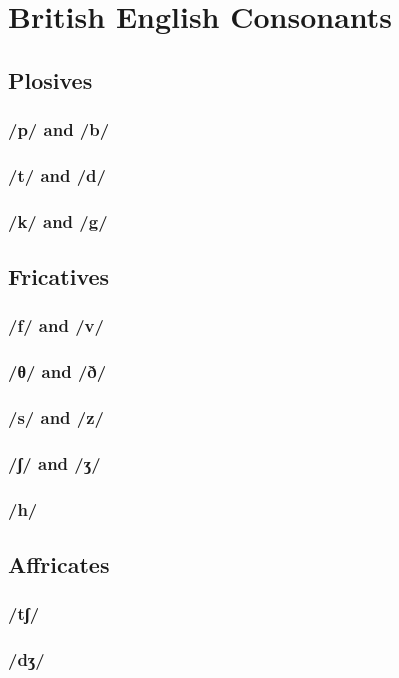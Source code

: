 \chapter{British English Consonants}

\section{Plosives}
\subsection{/p/ and /b/}
\subsection{/t/ and /d/}
\subsection{/k/ and /g/}

\section{Fricatives}
\subsection{/f/ and /v/}
\subsection{/θ/ and /ð/}
\subsection{/s/ and /z/}
\subsection{/ʃ/ and /ʒ/}
\subsection{/h/}

\section{Affricates}
\subsection{/tʃ/}
\subsection{/dʒ/}

